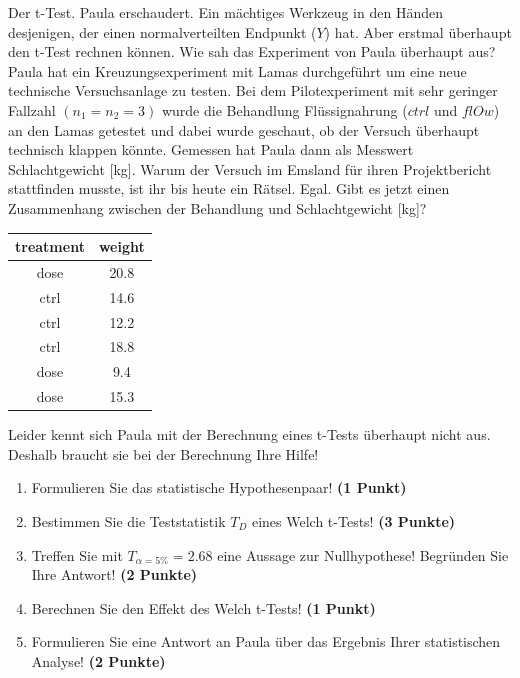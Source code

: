 \documentclass[a4paper, 9pt]{scrartcl}\usepackage[]{graphicx}\usepackage[]{xcolor}
\begin{document}
Der t-Test. Paula erschaudert. Ein mächtiges Werkzeug in den Händen desjenigen, der einen normalverteilten Endpunkt ($Y$) hat. Aber erstmal überhaupt den t-Test rechnen können. Wie sah das Experiment von Paula überhaupt aus? Paula hat ein Kreuzungsexperiment mit Lamas durchgeführt um eine neue technische Versuchsanlage zu testen. Bei dem Pilotexperiment mit sehr geringer Fallzahl $(n_1 = n_2 = 3)$ wurde die Behandlung Flüssignahrung ($ctrl$ und $flOw$) an den Lamas getestet und dabei wurde geschaut, ob der Versuch überhaupt technisch klappen könnte. Gemessen hat Paula dann als Messwert Schlachtgewicht [kg]. Warum der Versuch im Emsland für ihren Projektbericht stattfinden musste, ist ihr bis heute ein Rätsel. Egal. Gibt es jetzt einen Zusammenhang zwischen der Behandlung und Schlachtgewicht [kg]?

\begin{table}[!h]
\centering
\begin{tabular}{cc}
\toprule
treatment & weight\\
\midrule
dose & 20.8\\
ctrl & 14.6\\
ctrl & 12.2\\
ctrl & 18.8\\
dose & 9.4\\
\addlinespace
dose & 15.3\\
\bottomrule
\end{tabular}
\end{table}



Leider kennt sich Paula mit der Berechnung eines t-Tests überhaupt nicht aus. Deshalb braucht sie bei der Berechnung Ihre Hilfe!

\begin{enumerate}
  \item Formulieren Sie das statistische Hypothesenpaar! \textbf{(1 Punkt)}
  \item Bestimmen Sie die Teststatistik $T_{D}$ eines Welch t-Tests! \textbf{(3 Punkte)}
  \item Treffen Sie mit $T_{\alpha = 5\%} = 2.68$ eine Aussage zur Nullhypothese! Begründen Sie Ihre Antwort! \textbf{(2 Punkte)}
  \item Berechnen Sie den Effekt des Welch t-Tests! \textbf{(1 Punkt)}
  \item Formulieren Sie eine Antwort an Paula über das Ergebnis Ihrer statistischen Analyse! \textbf{(2 Punkte)}
\end{enumerate} 
\clearpage
\end{document}
